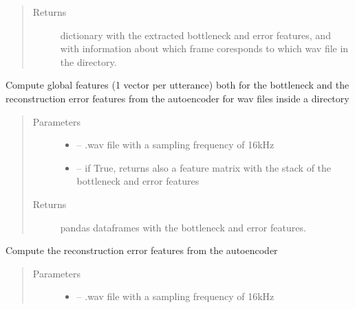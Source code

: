 \documentclass[letterpaper,10pt,english]{sphinxmanual}
\begin{document}
\begin{fulllineitems}
\begin{fulllineitems}
\begin{quote}
\begin{description}
\item[{Returns}] \leavevmode
dictionary with the extracted bottleneck and error features, and with information about which frame coresponds to which wav file in the directory.

\end{description}\end{quote}

\end{fulllineitems}


\begin{fulllineitems}
\label{\detokenize{RepLearning:replearning.AEspeech.compute_global_features}}
Compute global features (1 vector per utterance) both for the bottleneck and the reconstruction error features from the autoencoder for wav files inside a directory
\begin{quote}\begin{description}
\item[{Parameters}] \leavevmode\begin{itemize}
\item {} 
 -- .wav file with a sampling frequency of 16kHz

\item {} 
 -- if True, returns also a feature matrix with the stack of the bottleneck and error features

\end{itemize}

\item[{Returns}] \leavevmode
pandas dataframes with the bottleneck and error features.

\end{description}\end{quote}

\end{fulllineitems}


\begin{fulllineitems}
\label{\detokenize{RepLearning:replearning.AEspeech.compute_rec_error_features}}
Compute the  reconstruction error features from the autoencoder
\begin{quote}\begin{description}
\item[{Parameters}] \leavevmode\begin{itemize}
\item {} 
 -- .wav file with a sampling frequency of 16kHz


\end{itemize}
\end{description}
\end{quote}
\end{fulllineitems}
\end{fulllineitems}
\end{document}
